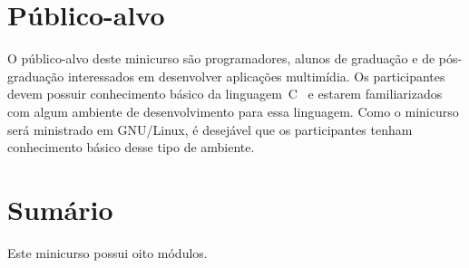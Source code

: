 \documentclass{SBCbookchapter}
\begin{document}

\section{Público-alvo}

O público-alvo deste minicurso são programadores, alunos de graduação e de
pós-graduação interessados em desenvolver aplicações multimídia.  Os
participantes devem possuir conhecimento básico da
linguagem~C~\cite{Kernighan-B-W-1988} e estarem familiarizados com algum
ambiente de desenvolvimento para essa linguagem.  Como o minicurso será
ministrado em GNU/Linux, é desejável que os participantes tenham
conhecimento básico desse tipo de ambiente.


\section{Sumário}
Este minicurso possui oito módulos.
\end{document}
